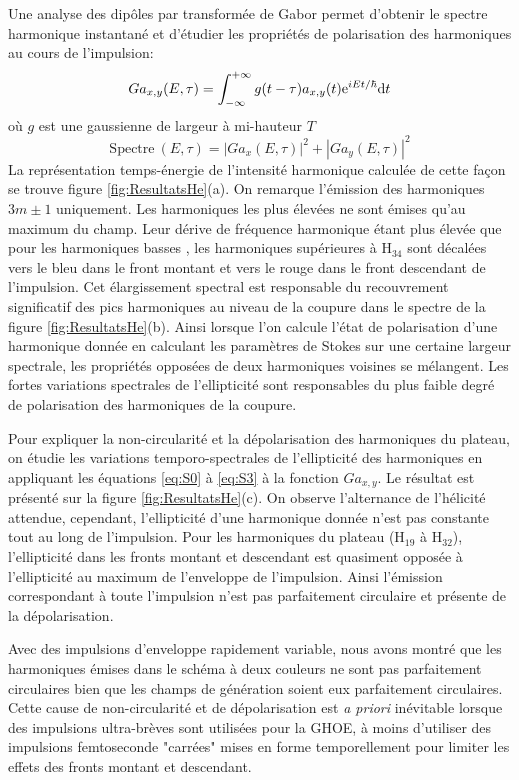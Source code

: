 Une analyse des dipôles par transformée de Gabor permet d'obtenir le spectre harmonique instantané et d'étudier les propriétés de polarisation des harmoniques au cours de l'impulsion:
\begin{equation}
Ga_{x,y} (E,\tau) = \int_{- \infty}^{+\infty} g(t-\tau) a_{x,y}(t) \mathrm{e}^{iEt/\hbar} \mathrm{d} t
\end{equation}
où $g$ est une gaussienne de largeur à mi-hauteur $T$
\begin{equation}
\text{Spectre} \: (E, \tau) = |Ga_x (E,\tau)|^2 + |Ga_y (E,\tau)|^2
\end{equation}
La représentation temps-énergie de l'intensité harmonique calculée de cette façon se trouve figure \ref{fig:ResultatsHe}(a). On remarque l'émission des harmoniques $3m \pm 1$ uniquement. Les harmoniques les plus élevées ne sont émises qu'au maximum du champ.  Leur dérive de fréquence harmonique étant plus élevée que pour les harmoniques basses , les harmoniques supérieures à H$_{34}$ sont décalées vers le bleu dans le front montant et vers le rouge dans le front descendant de l'impulsion. Cet élargissement spectral est responsable du recouvrement significatif des pics harmoniques au niveau de la coupure dans le spectre de la figure \ref{fig:ResultatsHe}(b). Ainsi lorsque l'on calcule l'état de polarisation d'une harmonique donnée en calculant les paramètres de Stokes sur une certaine largeur spectrale, les propriétés opposées de deux harmoniques voisines se mélangent. Les fortes variations spectrales de l'ellipticité sont responsables du plus faible degré de polarisation des harmoniques de la coupure.

Pour expliquer la non-circularité et la dépolarisation des harmoniques du plateau, on étudie les variations temporo-spectrales de l'ellipticité des harmoniques en appliquant les équations \ref{eq:S0} à \ref{eq:S3} à la fonction $Ga_{x,y}$. Le résultat est présenté sur la figure \ref{fig:ResultatsHe}(c). On observe l'alternance de l'hélicité attendue, cependant, l'ellipticité d'une harmonique donnée n'est pas constante tout au long de l'impulsion. Pour les harmoniques du plateau (H$_{19}$ à H$_{32}$), l'ellipticité dans les fronts montant et descendant est quasiment opposée à l'ellipticité au maximum de l'enveloppe de l'impulsion. Ainsi l'émission correspondant à toute l'impulsion n'est pas parfaitement circulaire et présente de la dépolarisation.

Avec des impulsions d'enveloppe rapidement variable, nous avons montré que les harmoniques émises dans le schéma à deux couleurs ne sont pas parfaitement circulaires bien que les champs de génération soient eux parfaitement circulaires. Cette cause de non-circularité et de dépolarisation est \textit{a priori} inévitable lorsque des impulsions ultra-brèves sont utilisées pour la GHOE, à moins d'utiliser des impulsions femtoseconde "carrées" mises en forme temporellement pour limiter les effets des fronts montant et descendant.


